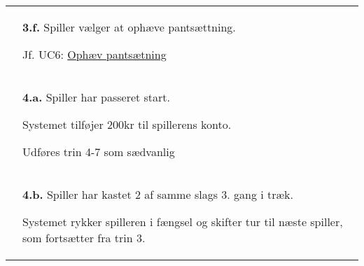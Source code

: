 \documentclass[class=article, crop=false]{standalone}
\begin{document}
\begin{table}[H]
\begin{tabularx}{\textwidth}{|l|X|}
                            & \textbf{3.f.} Spiller vælger at ophæve pantsættning.
                            \begin{enumerate} \begin{tabenum}
                                                  \item Jf. UC6: \underline{Ophæv pantsætning}
                            \end{tabenum} \end{enumerate}
                            \\



            & \textbf{4.a.} Spiller har passeret start.
                                \begin{enumerate} \begin{tabenum}
                                        \item Systemet tilføjer 200kr til spillerens konto.
                                        \item Udføres trin 4-7 som sædvanlig
                                    \end{tabenum} \end{enumerate}
                                 \\


                            & \textbf{4.b.} Spiller har kastet 2 af samme slags 3. gang i træk.
                            \begin{enumerate} \begin{tabenum}

                                                  \item Systemet rykker spilleren i fængsel og skifter tur til næste spiller, som fortsætter fra trin 3.
                            \end{tabenum} \end{enumerate}
                            \\





\end{tabularx}
\end{table}
\end{document}
